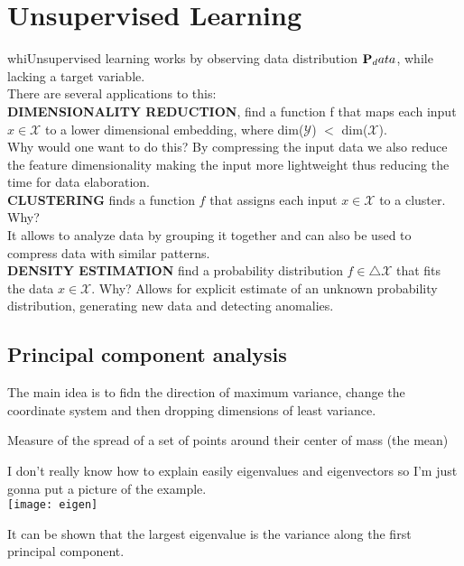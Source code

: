 \chapter{Unsupervised Learning}
whiUnsupervised learning works by observing data distribution ${\bf P}_data$,  while lacking a target variable.\\
There are several applications to this: \\
{\bf DIMENSIONALITY REDUCTION}, find a function f that maps each input $x \in \mathscr{X}$ to a lower dimensional embedding, where dim($\mathscr{Y}$) $ < $ dim($\mathscr{X}$). \\
Why would one want to do this? By compressing the input data we also reduce the feature dimensionality making the input more lightweight thus reducing the time for data elaboration.\\
{\bf CLUSTERING} finds a function $f$ that assigns each input $x \in \mathscr{X}$ to a cluster. Why? \\
It allows to analyze data by grouping it together and can also be used to compress data with similar patterns.\\
{\bf DENSITY ESTIMATION} find a probability distribution $f \in \triangle \mathscr{X}$ that fits the data $x \in \mathscr{X}$. Why? 
Allows for explicit estimate of an unknown probability distribution, generating new data and detecting anomalies.\\
\section{Principal component analysis}
The main idea is to fidn the direction of maximum variance, change the coordinate system and then dropping dimensions of least variance. \\
\begin{definition}
	Measure of the spread of a set of points around their center of mass (the mean)
\end{definition}

I don't really know how to explain easily eigenvalues and eigenvectors so I'm just gonna put a picture of the example.
\\
\texttt{[image: eigen]}

It can be shown that the largest eigenvalue is the variance along the first principal component.

